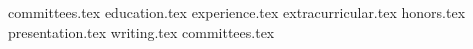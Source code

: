 \documentclass[11pt, a4paper]{awesome-cv}
\newcommand*{\sectiondir}{resume/}
\newcommand*{\sectiondir}{resume/}
\begin{document}
\makecvheader

{committees.tex}
{education.tex}
{experience.tex}
{extracurricular.tex}
{honors.tex}
{presentation.tex}
{writing.tex}
{committees.tex}
\end{document}
